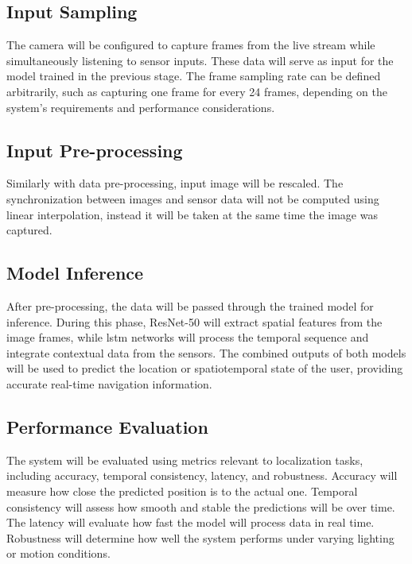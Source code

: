 \begin{refsection}
\subsection{Input Sampling}

The camera will be configured to capture frames from the live stream while simultaneously listening to sensor inputs. These data will serve as input for the model trained in the previous stage. The frame sampling rate can be defined arbitrarily, such as capturing one frame for every 24 frames, depending on the system's requirements and performance considerations.

\subsection{Input Pre-processing}

Similarly with data pre-processing, input image will be rescaled. The synchronization between images and sensor data will not be computed using linear interpolation, instead it will be taken at the same time the image was captured. 

\subsection{Model Inference}

After pre-processing, the data will be passed through the trained model for inference. During this phase, ResNet-50 will extract spatial features from the image frames, while \gls{lstm} networks will process the temporal sequence and integrate contextual data from the sensors. The combined outputs of both models will be used to predict the location or spatiotemporal state of the user, providing accurate real-time navigation information.

\subsection{Performance Evaluation}

The system will be evaluated using metrics relevant to localization tasks, including accuracy, temporal consistency, latency, and robustness. Accuracy will measure how close the predicted position is to the actual one. Temporal consistency will assess how smooth and stable the predictions will be over time. The latency will evaluate how fast the model will process data in real time. Robustness will determine how well the system performs under varying lighting or motion conditions.


\end{refsection}
